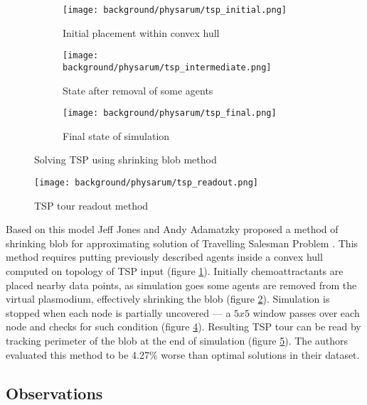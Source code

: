 \begin{figure}
  \centering
  \begin{subfigure}{0.3\textwidth}
    \centering
    \texttt{[image: background/physarum/tsp\_initial.png]}
    \caption{Initial placement within convex hull}
    \label{figure:bp_tsp_initial}
  \end{subfigure}
  \begin{subfigure}{0.3\textwidth}
    \centering
    \texttt{[image: background/physarum/tsp\_intermediate.png]}
    \caption{State after removal of some agents}
    \label{figure:bp_tsp_intermediate}
  \end{subfigure}
  \begin{subfigure}{0.3\textwidth}
    \centering
    \texttt{[image: background/physarum/tsp\_final.png]}
    \caption{Final state of simulation}
    \label{figure:bp_tsp_final}
  \end{subfigure}
  \caption{Solving TSP using shrinking blob method \cite{jones2014computation}}
\end{figure}

\begin{figure}
  \centering
  \texttt{[image: background/physarum/tsp\_readout.png]}
  \caption{TSP tour readout method \cite{jones2014computation}}
  \label{figure:bp_tsp_readout}
\end{figure}

Based on this model Jeff Jones and Andy Adamatzky proposed a method of shrinking blob for approximating solution of Travelling Salesman Problem \cite{jones2014computation}. This method requires putting previously described agents inside a convex hull computed on topology of TSP input (figure \ref{figure:bp_tsp_initial}). Initially chemoattractants are placed nearby data points, as simulation goes some agents are removed from the virtual plasmodium, effectively shrinking the blob (figure \ref{figure:bp_tsp_intermediate}). Simulation is stopped when each node is partially uncovered --- a $5x5$ window passes over each node and checks for such condition (figure \ref{figure:bp_tsp_final}). Resulting TSP tour can be read by tracking perimeter of the blob at the end of simulation (figure \ref{figure:bp_tsp_readout}). The authors evaluated this method to be 4.27\% worse than optimal solutions in their dataset.


\subsection{Observations}

